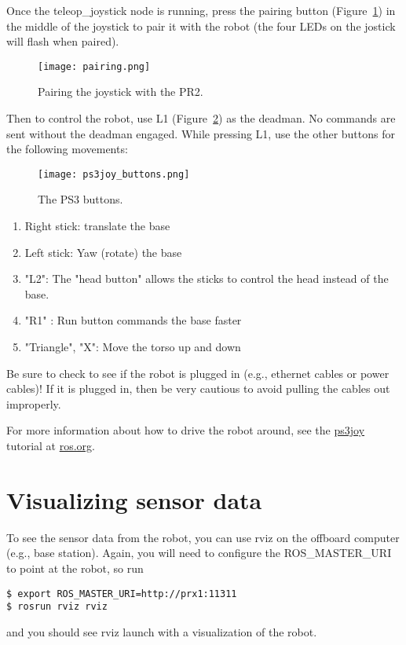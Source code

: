 Once the teleop\_joystick node is running, press the pairing button (Figure~\ref{fig:ps3_pairing}) in the middle of the 
joystick to pair it with the robot (the four LEDs on the jostick will flash when paired). 
\begin{figure}[H]
\centering
\texttt{[image: pairing.png]}
\caption{Pairing the joystick with the PR2.}
\label{fig:ps3_pairing}
\end{figure}
Then to control the robot, use L1 (Figure~\ref{fig:buttons}) as the deadman.
No commands are sent without the deadman engaged.
While pressing L1, use the other buttons for the following movements:
\begin{figure}[H]
\centering
\texttt{[image: ps3joy\_buttons.png]}
\caption{The PS3 buttons.}
\label{fig:buttons}
\end{figure}
\begin{enumerate}
\item Right stick: translate the base
\item Left stick: Yaw (rotate) the base
\item "L2": The "head button" allows the sticks to control the head instead of the base.
\item "R1" : Run button commands the base faster
\item "Triangle", "X": Move the torso up and down 
\end{enumerate}


Be sure to check to see if the robot is plugged in (e.g., ethernet cables or power cables)! If it is plugged in, then be very cautious to avoid pulling the cables out improperly.

For more information about how to drive the robot around, see the 
\href{http://www.ros.org/wiki/ps3joy/Tutorials/UsingJoystickWithPR2}{ps3joy} tutorial at \href{http://www.ros.org}{ros.org}. 

\section{Visualizing sensor data}
To see the sensor data from the robot, you can use rviz on the offboard computer (e.g., base station).  Again, you will 
need to configure the ROS\_MASTER\_URI to point at the robot, so run
\begin{verbatim}
$ export ROS_MASTER_URI=http://prx1:11311
$ rosrun rviz rviz
\end{verbatim}
and you should see rviz launch with a visualization of the robot.  

